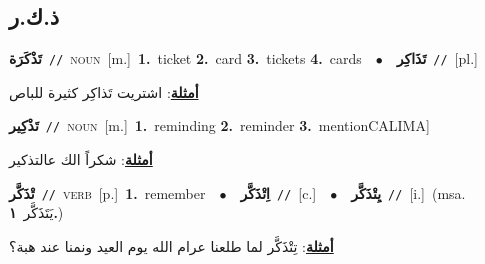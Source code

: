 \documentclass[10pt,a4paper,twoside]{article} %
\begin{document}
\begin{multicols}{2}
\vspace{-3mm}
\subsection*{\color{blue}\foreignlanguage{arabic}{ذ.ك.ر}\color{blue}{}} 

{\setlength\topsep{0pt}\textbf{\foreignlanguage{arabic}{تَذْكَرَة}}\ {\color{gray}\texttt{//}\color{black}}\ \textsc{noun}\ [m.]\ \textbf{1.}~ticket  \textbf{2.}~card  \textbf{3.}~tickets  \textbf{4.}~cards\ \ $\bullet$\ \ \setlength\topsep{0pt}\textbf{\foreignlanguage{arabic}{تَذَاكِر}}\ {\color{gray}\texttt{//}\color{black}}\ [pl.]\  \begin{flushright}\color{gray}\foreignlanguage{arabic}{\textbf{\underline{\foreignlanguage{arabic}{أمثلة}}}: اشتريت تَذاكِر كثيرة للباص}\end{flushright}\color{black}} \vspace{2mm}

{\setlength\topsep{0pt}\textbf{\foreignlanguage{arabic}{تَذْكِير}}\ {\color{gray}\texttt{//}\color{black}}\ \textsc{noun}\ [m.]\ \textbf{1.}~reminding  \textbf{2.}~reminder  \textbf{3.}~mentionCALIMA]\  \begin{flushright}\color{gray}\foreignlanguage{arabic}{\textbf{\underline{\foreignlanguage{arabic}{أمثلة}}}: شكراً الك عالتذكير}\end{flushright}\color{black}} \vspace{2mm}

{\setlength\topsep{0pt}\textbf{\foreignlanguage{arabic}{تْذَكَّر}}\ {\color{gray}\texttt{//}\color{black}}\ \textsc{verb}\ [p.]\ \textbf{1.}~remember\ \ $\bullet$\ \ \setlength\topsep{0pt}\textbf{\foreignlanguage{arabic}{اِتْذَكَّر}}\ {\color{gray}\texttt{//}\color{black}}\ [c.]\ \ $\bullet$\ \ \setlength\topsep{0pt}\textbf{\foreignlanguage{arabic}{يِتْذَكَّر}}\ {\color{gray}\texttt{//}\color{black}}\ [i.]\ \color{gray}(msa. \foreignlanguage{arabic}{يَتَذَكَّر}~\foreignlanguage{arabic}{\textbf{١.}})\color{black}\  \begin{flushright}\color{gray}\foreignlanguage{arabic}{\textbf{\underline{\foreignlanguage{arabic}{أمثلة}}}: تِتْذَكَّر لما طلعنا عرام الله يوم العيد ونمنا عند هبة؟}\end{flushright}\color{black}} \vspace{2mm}


\end{multicols}
\end{document}
